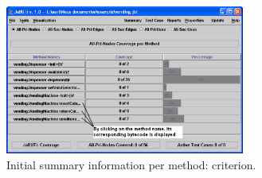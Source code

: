 \begin{figure}[!ht]
\begin{center}
\includegraphics[width=0.70\textwidth]{fig/summary-by-method-initial.eps}
\caption{\label{fig:initial-summary-method} Initial summary
information per method:  criterion.}
\end{center}
\end{figure}
